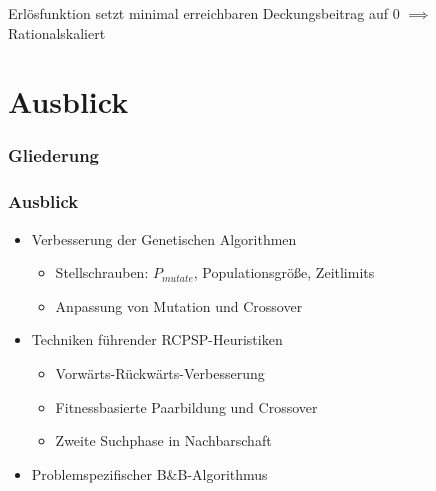 \begin{frame}[t]
\begin{footnotesize}
\begin{center}
\end{center}

Erlösfunktion setzt minimal erreichbaren Deckungsbeitrag auf 0 $\implies$ Rationalskaliert

\end{footnotesize}	

\end{frame}

\section{Ausblick}

\begin{frame}[noframenumbering]
\frametitle{Gliederung}
\end{frame}

\begin{frame}
\frametitle{Ausblick}
\begin{itemize}
\item Verbesserung der Genetischen Algorithmen
	\begin{itemize}
	\item Stellschrauben: $P_{mutate}$, Populationsgröße, Zeitlimits
	\item Anpassung von Mutation und Crossover\\[6mm]
	\end{itemize}
\item Techniken führender RCPSP-Heuristiken
	\begin{itemize}
	\item Vorwärts-Rückwärts-Verbesserung
	\item Fitnessbasierte Paarbildung und Crossover
	\item Zweite Suchphase in Nachbarschaft\\[6mm]
	\end{itemize}
\item Problemspezifischer B\&B-Algorithmus
\end{itemize}
\end{frame}




